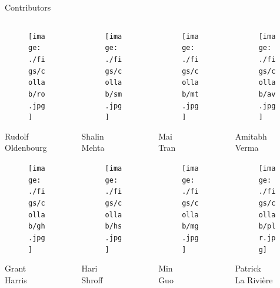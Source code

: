 \documentclass[presentation]{beamer}
\begin{document}
\begin{frame}[label=sec-20]{Contributors}
\begin{columns}
\begin{column}{0.25\textwidth}
\centering  \vspace{-1em}
\begin{figure}[t]
\texttt{[image: ./figs/collab/ro.jpg]}
\end{figure}\vspace{-1em}
Rudolf\\ Oldenbourg
\begin{figure}[t]
\texttt{[image: ./figs/collab/gh.jpg]}
\end{figure}\vspace{-1em}
Grant\\ Harris
\end{column}
\begin{column}{0.25\textwidth}
\centering  \vspace{-1em}
\begin{figure}[t]
\texttt{[image: ./figs/collab/sm.jpg]}
\end{figure}\vspace{-1em}
Shalin\\ Mehta
\begin{figure}[t]
\texttt{[image: ./figs/collab/hs.jpg]}
\end{figure}\vspace{-1em}
Hari\\Shroff
\end{column}
\begin{column}{0.25\textwidth}
\centering  \vspace{-1em}
\begin{figure}[t]
\texttt{[image: ./figs/collab/mt.jpg]}
\end{figure}\vspace{-1em}
Mai\\ Tran
\begin{figure}[t]
\texttt{[image: ./figs/collab/mg.jpg]}
\end{figure}\vspace{-1em}
Min\\ Guo 
\end{column}
\begin{column}{0.25\textwidth}
\centering  \vspace{-1em}
\begin{figure}[t]
\texttt{[image: ./figs/collab/av.jpg]}
\end{figure}\vspace{-1em}
Amitabh\\ Verma
\begin{figure}[t]
\texttt{[image: ./figs/collab/plr.jpg]}
\end{figure}\vspace{-1em}
 Patrick\\ La Rivi\`ere
\end{column}
\end{columns}
\end{frame}
\end{document}
